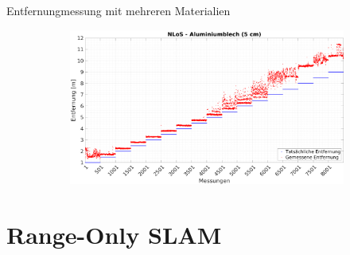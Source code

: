 \documentclass{beamer}
\begin{document}
\begin{frame}{Entfernungmessung mit mehreren Materialien}
\begin{figure}
\begin{subfigure}[t]{0.47\linewidth}
		\end{subfigure}
		\hfill
		\begin{subfigure}[t]{0.47\linewidth}
			\centering
			\includegraphics[width=\linewidth]{entfernungsmessung_2018_01_20_nlos_metal2}
		\end{subfigure}
	\end{figure}
\end{frame}


%
% 
%
\part{Range-Only SLAM}
\end{document}
